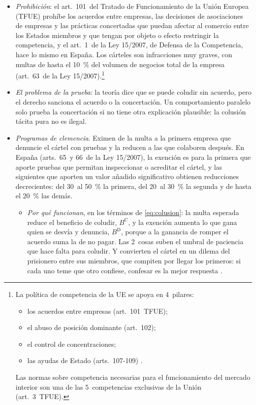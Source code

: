 \documentclass[11pt]{article}
\begin{document}
\begin{itemize}
\item \emph{Prohibición}: el art.~101~del Tratado de Funcionamiento de la Unión Europea (TFUE) prohíbe los acuerdos entre empresas, las decisiones de asociaciones de empresas y las prácticas concertadas que puedan afectar al comercio entre los Estados miembros y que tengan por objeto o efecto restringir la competencia\nocite{UE2016TFUE}, y el art.~1~de la Ley 15/2007, de Defensa de la Competencia, hace lo mismo en España\nocite{BOE2007LDC}. Los cárteles son infracciones muy graves, con multas de hasta el 10~\% del volumen de negocios total de la empresa (art.~63~de la Ley 15/2007).\footnote{La política de competencia de la UE se apoya en 4~pilares:
\begin{itemize}
\item los acuerdos entre empresas (art.~101~TFUE);
\item el abuso de posición dominante (art.~102);
\item el control de concentraciones\nocite{UE2004Reglamento139};
\item las ayudas de Estado (arts.~107-109) .
\end{itemize}
Las normas sobre competencia necesarias para el funcionamiento del mercado interior son una de las 5~competencias exclusivas de la Unión (art.~3~TFUE).}
\item \emph{El problema de la prueba}: la teoría dice que se puede coludir sin acuerdo, pero el derecho sanciona el acuerdo o la concertación. Un comportamiento paralelo solo prueba la concertación si no tiene otra explicación plausible\nocite{TJUE1993PastaPapel}: la colusión tácita pura no es ilegal.
\item \emph{Programas de clemencia}. Eximen de la multa a la primera empresa que denuncie el cártel con pruebas y la reducen a las que colaboren después\nocite{UE2006Clemencia}. En España (arts.~65~y 66~de la Ley 15/2007), la exención es para la primera que aporte pruebas que permitan inspeccionar o acreditar el cártel, y las siguientes que aporten un valor añadido significativo obtienen reducciones decrecientes: del 30~al 50~\% la primera, del 20~al 30~\% la segunda y de hasta el 20~\% las demás\nocite{BOE2007LDC}.
  \begin{itemize}
  \item \emph{Por qué funcionan}, en los términos de \eqref{eq:colusion}: la multa esperada reduce el beneficio de coludir, $B^{\mathrm C}$, y la exención aumenta lo que gana quien se desvía y denuncia, $B^{\mathrm D}$, porque a la ganancia de romper el acuerdo suma la de no pagar. Las 2~cosas suben el umbral de paciencia que hace falta para coludir. Y convierten el cártel en un dilema del prisionero entre sus miembros, que compiten por llegar los primeros: si cada uno teme que otro confiese, confesar es la mejor respuesta\nocite{MottaPolo2003Leniency} .

\end{itemize}
\end{itemize}
\end{document}
